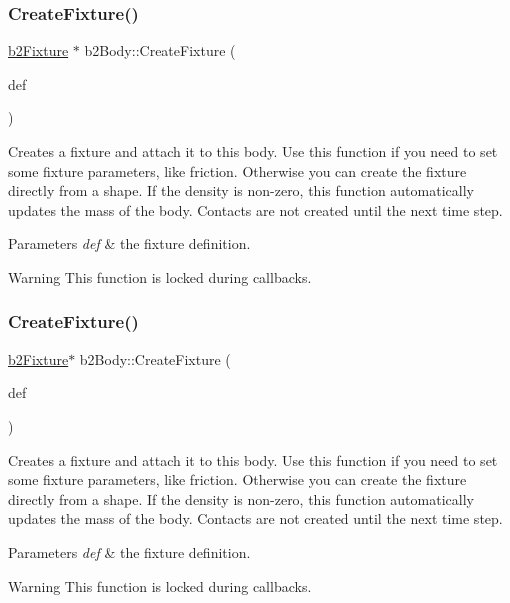 \subsubsection{\texorpdfstring{Create\+Fixture()}{CreateFixture()}\hspace{0.1cm}{\footnotesize\ttfamily [1/4]}}
{\footnotesize\ttfamily \hyperlink{classb2Fixture}{b2\+Fixture} $\ast$ b2\+Body\+::\+Create\+Fixture (\begin{DoxyParamCaption}\item[{const \hyperlink{structb2FixtureDef}{b2\+Fixture\+Def} $\ast$}]{def }\end{DoxyParamCaption})}

Creates a fixture and attach it to this body. Use this function if you need to set some fixture parameters, like friction. Otherwise you can create the fixture directly from a shape. If the density is non-\/zero, this function automatically updates the mass of the body. Contacts are not created until the next time step. 
\begin{DoxyParams}{Parameters}
{\em def} & the fixture definition. \\
\hline
\end{DoxyParams}
\begin{DoxyWarning}{Warning}
This function is locked during callbacks. 
\end{DoxyWarning}
\mbox{\label{classb2Body_a40dda91b34418bb40e31e2db9b1b76a5}} 
\subsubsection{\texorpdfstring{Create\+Fixture()}{CreateFixture()}\hspace{0.1cm}{\footnotesize\ttfamily [2/4]}}
{\footnotesize\ttfamily \hyperlink{classb2Fixture}{b2\+Fixture}$\ast$ b2\+Body\+::\+Create\+Fixture (\begin{DoxyParamCaption}\item[{const \hyperlink{structb2FixtureDef}{b2\+Fixture\+Def} $\ast$}]{def }\end{DoxyParamCaption})}

Creates a fixture and attach it to this body. Use this function if you need to set some fixture parameters, like friction. Otherwise you can create the fixture directly from a shape. If the density is non-\/zero, this function automatically updates the mass of the body. Contacts are not created until the next time step. 
\begin{DoxyParams}{Parameters}
{\em def} & the fixture definition. \\
\hline
\end{DoxyParams}
\begin{DoxyWarning}{Warning}
This function is locked during callbacks. 
\end{DoxyWarning}
\mbox{\label{classb2Body_a52d971867086d5db79769a62bbb70a60}} 

